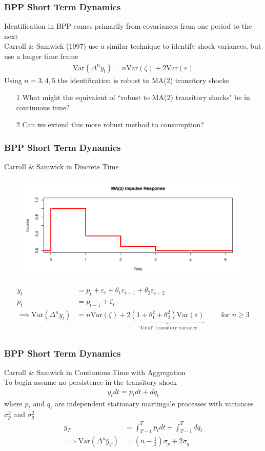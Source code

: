\documentclass{beamer}
\begin{document}
\frame
{
	\frametitle{BPP Short Term Dynamics}
	Identification in BPP comes primarily from covariances from one period to the next\\
	\bigskip
	Carroll \& Samwick (1997) use a similar technique to identify shock variances, but use a longer time frame
	\begin{align*}
		\mathrm{Var}(\Delta^n y_t) = n \mathrm{Var} (\zeta) + 2 \mathrm{Var}(\varepsilon)
	\end{align*}
	Using $n=3,4,5$ the identification is robust to MA(2) transitory shocks\\
	\bigskip
	\pause
	\begin{itemize}
		\item[1] What might the equivalent of ``robust to MA(2) transitory shocks" be in continuous time?
		\item[2] Can we extend this more robust method to consumption?
	\end{itemize}
}
\frame
{
	\frametitle{BPP Short Term Dynamics}
	Carroll \& Samwick in Discrete Time
	\begin{figure}
	\includegraphics[scale=0.3]{../Figures/MA2.png}
	\end{figure}
	\begin{align*}
		y_t &= p_t + \varepsilon_t + \theta_1 \varepsilon_{t-1} + \theta_2 \varepsilon_{t-2} \\
		p_t &= p_{t-1} +\zeta_t\\
		\implies \mathrm{Var}(\Delta^n y_t) &= n \mathrm{Var}(\zeta) + 2\underbrace{(1+\theta_1^2 + \theta_2^2)\mathrm{Var}(\varepsilon)}_\text{``Total" transitory variance} \qquad \text{ for $n \geq 3$} \\
	\end{align*}	

}
\frame
{
	\frametitle{BPP Short Term Dynamics}
	Carroll \& Samwick in Continuous Time with Aggregation\\
	\bigskip
	To begin assume no persistence in the transitory shock
	\begin{align*}
		y_t dt = p_t dt + dq_t
	\end{align*}
	where $p_t$ and $q_t$ are independent stationary martingale processes with variances $\sigma^2_p$ and $\sigma^2_q$
	\begin{align*}
	\bar{y}_T &= \int_{T-1}^{T}p_t dt + \int_{T-1}^{T}dq_t \\
	\implies  \mathrm{Var}(\Delta^n \bar{y}_T) &= (n-\frac{1}{3})\sigma_p + 2\sigma_q
	\end{align*}
}
\end{document}

